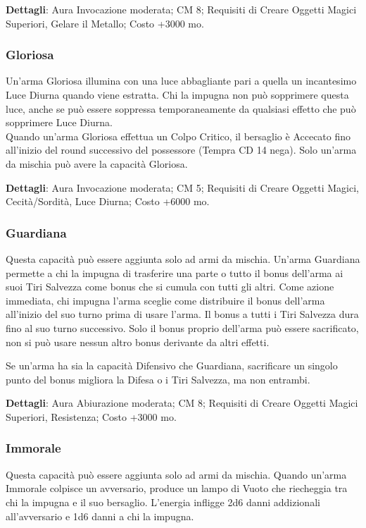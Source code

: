 \begin{multicols}{2}
\textbf{Dettagli}: Aura Invocazione moderata; CM 8; Requisiti di Creare Oggetti Magici Superiori, Gelare il Metallo; Costo +3000 mo.

\subsubsection{Gloriosa}

Un'arma Gloriosa illumina con una luce abbagliante pari a quella un incantesimo Luce Diurna quando viene estratta. Chi la impugna non può sopprimere questa luce, anche se può essere soppressa temporaneamente da qualsiasi effetto che può sopprimere Luce Diurna. \\
Quando un'arma Gloriosa effettua un Colpo Critico, il bersaglio è Accecato fino all'inizio del round successivo del possessore (Tempra CD 14 nega). Solo un'arma da mischia può avere la capacità Gloriosa.

\textbf{Dettagli}: Aura Invocazione moderata; CM 5; Requisiti di Creare Oggetti Magici, Cecità/Sordità,  Luce Diurna; Costo +6000 mo.

\subsubsection{Guardiana}

Questa capacità può essere aggiunta solo ad armi da mischia. Un'arma Guardiana permette a chi la impugna di trasferire una parte o tutto il bonus dell'arma ai suoi Tiri Salvezza come bonus che si cumula con tutti gli altri. Come azione immediata, chi impugna l'arma sceglie come distribuire il bonus dell'arma all'inizio del suo turno prima di usare l'arma. Il bonus a tutti i Tiri Salvezza dura fino al suo turno successivo. Solo il bonus proprio dell'arma può essere sacrificato, non si può usare nessun altro bonus derivante da altri effetti.

Se un'arma ha sia la capacità Difensivo che Guardiana, sacrificare un singolo punto del bonus migliora la Difesa o i Tiri Salvezza, ma non entrambi.

\textbf{Dettagli}: Aura Abiurazione moderata; CM 8; Requisiti di Creare Oggetti Magici Superiori, Resistenza; Costo +3000 mo.

\subsubsection{Immorale}

Questa capacità può essere aggiunta solo ad armi da mischia. Quando un'arma Immorale colpisce un avversario, produce un lampo di Vuoto che riecheggia tra chi la impugna e il suo bersaglio. L'energia infligge 2d6 danni addizionali all'avversario e 1d6 danni a chi la impugna.


\end{multicols}
